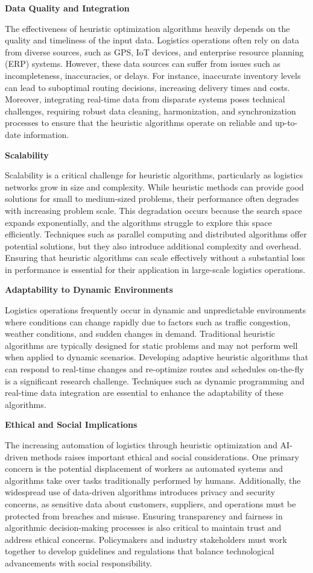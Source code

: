 \documentclass[
]{article}
\begin{document}
\textbf{Data Quality and Integration}

The effectiveness of heuristic optimization algorithms heavily depends on the quality and timeliness of the input data. Logistics operations often rely on data from diverse sources, such as GPS, IoT devices, and enterprise resource planning (ERP) systems. However, these data sources can suffer from issues such as incompleteness, inaccuracies, or delays. For instance, inaccurate inventory levels can lead to suboptimal routing decisions, increasing delivery times and costs. Moreover, integrating real-time data from disparate systems poses technical challenges, requiring robust data cleaning, harmonization, and synchronization processes to ensure that the heuristic algorithms operate on reliable and up-to-date information.

\textbf{Scalability}

Scalability is a critical challenge for heuristic algorithms, particularly as logistics networks grow in size and complexity. While heuristic methods can provide good solutions for small to medium-sized problems, their performance often degrades with increasing problem scale. This degradation occurs because the search space expands exponentially, and the algorithms struggle to explore this space efficiently. Techniques such as parallel computing and distributed algorithms offer potential solutions, but they also introduce additional complexity and overhead. Ensuring that heuristic algorithms can scale effectively without a substantial loss in performance is essential for their application in large-scale logistics operations.

\textbf{Adaptability to Dynamic Environments}

Logistics operations frequently occur in dynamic and unpredictable environments where conditions can change rapidly due to factors such as traffic congestion, weather conditions, and sudden changes in demand. Traditional heuristic algorithms are typically designed for static problems and may not perform well when applied to dynamic scenarios. Developing adaptive heuristic algorithms that can respond to real-time changes and re-optimize routes and schedules on-the-fly is a significant research challenge. Techniques such as dynamic programming and real-time data integration are essential to enhance the adaptability of these algorithms.

\textbf{Ethical and Social Implications}

The increasing automation of logistics through heuristic optimization and AI-driven methods raises important ethical and social considerations. One primary concern is the potential displacement of workers as automated systems and algorithms take over tasks traditionally performed by humans. Additionally, the widespread use of data-driven algorithms introduces privacy and security concerns, as sensitive data about customers, suppliers, and operations must be protected from breaches and misuse. Ensuring transparency and fairness in algorithmic decision-making processes is also critical to maintain trust and address ethical concerns. Policymakers and industry stakeholders must work together to develop guidelines and regulations that balance technological advancements with social responsibility.
\end{document}
